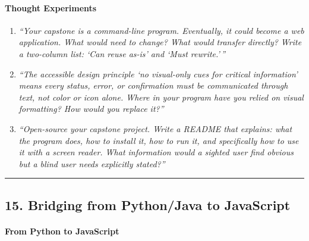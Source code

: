 \documentclass[
  justified,
  openright,
]{tufte-book}
\let\subsubsection\paragraph
\let\paragraph\paragraph
\newcommand{\BuiltInTok}[1]{#1}
\newcommand{\CommentTok}[1]{\textcolor{MidGray}{#1}}
\newcommand{\FunctionTok}[1]{\textcolor{BrandBlue}{#1}}
\newcommand{\KeywordTok}[1]{\textcolor{BrandBlue}{#1}}
\newcommand{\NormalTok}[1]{#1}
\newcommand{\OperatorTok}[1]{\textcolor{DarkGray}{#1}}
\newcommand{\SpecialCharTok}[1]{\textcolor{Teal}{#1}}
\newcommand{\VerbatimStringTok}[1]{\textcolor{Teal}{#1}}
\newenvironment{Shaded}{%
  \begin{snugshade}
}{%
  \end{snugshade}
}
\let\subsubsection\paragraph
\let\paragraph\paragraph
\begin{document}
\begin{Shaded}
\end{Shaded}

\paragraph{Thought Experiments}\label{thought-experiments-11}

\begin{enumerate}
\def\labelenumi{\arabic{enumi}.}
\item
  \emph{``Your capstone is a command-line program. Eventually, it could
  become a web application. What would need to change? What would
  transfer directly? Write a two-column list: `Can reuse as-is' and
  `Must rewrite.'\,''}
\item
  \emph{``The accessible design principle `no visual-only cues for
  critical information' means every status, error, or confirmation must
  be communicated through text, not color or icon alone. Where in your
  program have you relied on visual formatting? How would you replace
  it?''}
\item
  \emph{``Open-source your capstone project. Write a README that
  explains: what the program does, how to install it, how to run it, and
  specifically how to use it with a screen reader. What information
  would a sighted user find obvious but a blind user needs explicitly
  stated?''}
\end{enumerate}

\begin{center}\rule{0.5\linewidth}{0.5pt}\end{center}

\subsection{15. Bridging from Python/Java to
JavaScript}\label{bridging-from-pythonjava-to-javascript}

\subsubsection{From Python to
JavaScript}\label{from-python-to-javascript}
\end{document}
